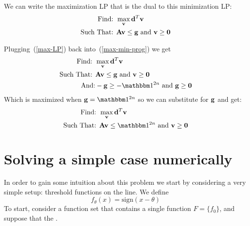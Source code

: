 \documentclass{article}[12pt]
\begin{document}
We can write the maximization LP that is the dual to this minimization LP:
\begin{eqnarray}
\mbox{Find: }& \max_{\mathbf{v}} \mathbf{d}^T \mathbf{v} \label{max-LP}\\
\mbox{Such That: }& \mathbf{A} \mathbf{v} \leq \mathbf{g} \mbox{ and } \mathbf{v} \geq \mathbf{0} \notag
\end{eqnarray}

Plugging~(\ref{max-LP}) back into~(\ref{max-min-prog}) we get
\begin{eqnarray}
\mbox{Find: }& \max_\vv \vd^T \vv \label{combined1}\\
\mbox{Such That: }& \vA \vv \leq \vg \mbox{ and } \vv \geq \vzero
\notag \\
\mbox{And:}& -\vg \geq -\ones{2n} \mbox{ and } \vg \geq \vzero \notag
\end{eqnarray}
Which is maximized when $\vg = \ones{2n}$ so we can substitute for
$\mathbf{g}$ and get:
\begin{eqnarray}
\mbox{Find: }& \max_\vv \vd^T \vv \label{combined2}\\
\mbox{Such That: }& \vA \vv \leq \ones{2n} \mbox{ and } \vv \geq \vzero \notag
\end{eqnarray}

\section{Solving a simple case numerically}

In order to gain some intuition about this problem we start by
considering a very simple setup: threshold functions on the line.
We define 
\newcommand{\sign}{\mbox{sign}}
\[
f_{\theta}(x) = \sign(x-\theta)
\]
To start, consider a function set that contains a single function
$F=\{f_0\}$, and suppose that the .
\end{document}

